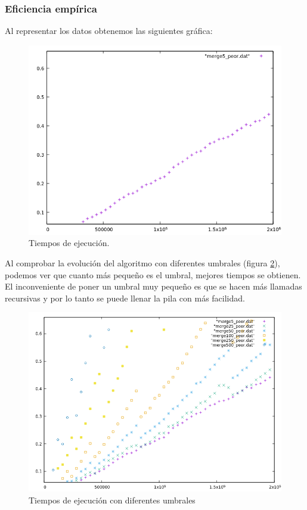 \subsubsection{Eficiencia empírica}

Al representar los datos obtenemos las siguientes gráfica:

\begin{figure}[H]
    \begin{center}
        \includegraphics[scale=0.7]{imagenes/g_m.png}
        \caption{Tiempos de ejecución.}
        \label{fig11}
    \end{center}
\end{figure}

Al comprobar la evolución del algoritmo con diferentes umbrales (figura \ref{fig12}), podemos ver que cuanto más pequeño es el umbral, mejores tiempos se obtienen. El inconveniente de poner un umbral muy pequeño es que se hacen más llamadas recursivas y por lo tanto se puede llenar la pila con más facilidad.

\begin{figure}[H]
    \begin{center}
        \includegraphics[scale=0.7]{imagenes/umbral.png}
        \caption{Tiempos de ejecución con diferentes umbrales}
        \label{fig12}
    \end{center}
\end{figure}

